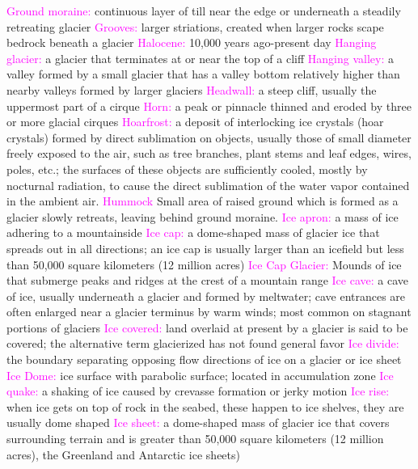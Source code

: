 \documentclass{article}
\newcommand{\pink}[1]{\textcolor{magenta}{#1}}
\newcommand{\vocab}[1]{{\pink{#1}}}
\begin{document}
\begin{multicols*}{4}
		\vocab{        Ground moraine: } continuous layer of till near the edge or underneath a steadily retreating glacier 
		\vocab{Grooves: } larger striations, created when larger rocks scape bedrock beneath a glacier  
		\vocab{ Halocene: } 10,000 years ago-present day
		\vocab{        Hanging glacier: } a glacier that terminates at or near the top of a cliff 
		\vocab{        Hanging valley: } a valley formed by a small glacier that has a valley bottom relatively higher than nearby valleys formed by larger glaciers 
		\vocab{        Headwall: } a steep cliff, usually the uppermost part of a cirque 
		\vocab{        Horn: } a peak or pinnacle thinned and eroded by three or more glacial cirques 
		\vocab{Hoarfrost:} a deposit of interlocking ice crystals (hoar crystals) formed by direct sublimation on objects, usually those of small diameter freely exposed to the air, such as tree branches, plant stems and leaf edges, wires, poles, etc.; the surfaces of these objects are sufficiently cooled, mostly by nocturnal radiation, to cause the direct sublimation of the water vapor contained in the ambient air.
		\vocab{Hummock} Small area of raised ground which is formed as a glacier slowly retreats, leaving behind ground moraine.  
		\vocab{        Ice apron: } a mass of ice adhering to a mountainside 
		\vocab{        Ice cap: } a dome-shaped mass of glacier ice that spreads out in all directions; an ice cap is usually larger than an icefield but less than 50,000 square kilometers (12 million acres) 
		\vocab{Ice Cap Glacier: } Mounds of ice that submerge peaks and ridges at the crest of a mountain range  
		\vocab{        Ice cave: } a cave of ice, usually underneath a glacier and formed by meltwater; cave entrances are often enlarged near a glacier terminus by warm winds; most common on stagnant portions of glaciers 
		\vocab{        Ice covered: } land overlaid at present by a glacier is said to be covered; the alternative term glacierized has not found general favor 
		\vocab{        Ice divide: } the boundary separating opposing flow directions of ice on a glacier or ice sheet 
		\vocab{        Ice Dome: } ice surface with parabolic surface; located in accumulation zone   
		\vocab{        Ice quake: } a shaking of ice caused by crevasse formation or jerky motion 
		\vocab{Ice rise: } when ice gets on top of rock in the seabed, these happen to ice shelves, they are usually dome shaped  
		\vocab{        Ice sheet: } a dome-shaped mass of glacier ice that covers surrounding terrain and is greater than 50,000 square kilometers (12 million acres), the Greenland and Antarctic ice sheets) 

\end{multicols*}
\end{document}
